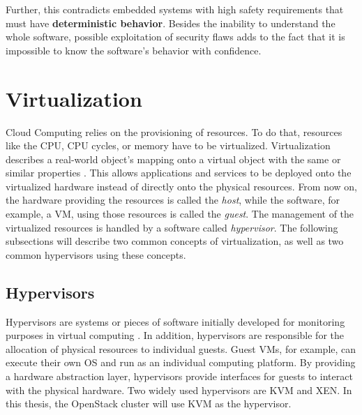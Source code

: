                 \noindent Further, this contradicts embedded systems with high safety requirements that must have \textbf{deterministic behavior}.
                Besides the inability to understand the whole software, possible exploitation of security flaws adds to the fact that it is impossible to know the software's behavior with confidence. 
            
    
    \section{Virtualization}
    \label{section:virtualization}
    
        Cloud Computing relies on the provisioning of resources. 
        To do that, resources like the \ac{CPU}, \ac{CPU} cycles, or memory have to be virtualized.
        Virtualization describes a real-world object's mapping onto a virtual object with the same or similar properties \cite{Garbacki2007}.
        This allows applications and services to be deployed onto the virtualized hardware instead of directly onto the physical resources.
        From now on, the hardware providing the resources is called the \textsl{host}, while the software, for example, a \ac{VM}, using those resources is called the \textsl{guest}.
        The management of the virtualized resources is handled by a software called \textsl{hypervisor}.
        The following subsections will describe two common concepts of virtualization, as well as two common hypervisors using these concepts.
        
        
        \subsection{Hypervisors}
        \label{subsection:hypervisors}
        
            Hypervisors are systems or pieces of software initially developed for monitoring purposes in virtual computing \cite{Blenk2016}.
            In addition, hypervisors are responsible for the allocation of physical resources to individual guests.
            Guest \acp{VM}, for example, can execute their own \ac{OS} and run as an individual computing platform.
            By providing a hardware abstraction layer, hypervisors provide interfaces for guests to interact with the physical hardware.
            Two widely used hypervisors are \ac{KVM} and XEN.
            In this thesis, the OpenStack cluster will use \ac{KVM} as the hypervisor.
        
